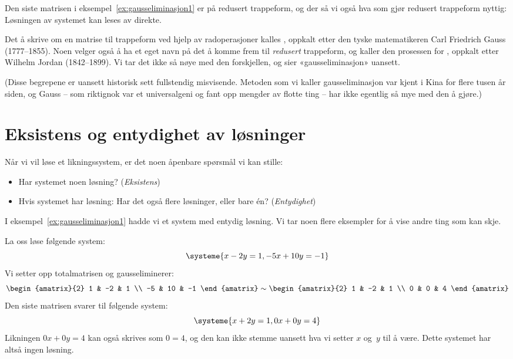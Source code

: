 Den siste matrisen i eksempel~\ref{ex:gausseliminasjon1} er på
redusert trappeform, og der så vi også hva som gjør redusert
trappeform nyttig: Løsningen av systemet kan leses av direkte.

\medskip
Det å  skrive om en matrise til trappeform
ved hjelp av radoperasjoner
kalles , oppkalt etter den tyske
matematikeren Carl Friedrich Gauss (1777--1855).  Noen velger også å
ha et eget navn på det å komme frem til \emph{redusert} trappeform, og
kaller den prosessen for , oppkalt
etter Wilhelm Jordan (1842--1899).  Vi tar det ikke så nøye med den
forskjellen, og sier «gauss\-eliminasjon» uansett.

(Disse begrepene er uansett historisk sett fullstendig misvisende.
Metoden som vi kaller gauss\-eli\-minasjon var kjent i Kina for flere
tusen år siden, og Gauss -- som riktignok var et universalgeni og fant
opp mengder av flotte ting -- har ikke egentlig så mye med den å
gjøre.)


\section*{Eksistens og entydighet av løsninger}

Når vi vil løse et likningssystem, er det noen åpenbare spørsmål vi
kan stille:
\begin{itemize}
\item Har systemet noen løsning? (\emph{Eksistens})
\item Hvis systemet har løsning: Har det også flere løsninger, eller
bare én?  (\emph{Entydighet})
\end{itemize}

I eksempel~\ref{ex:gausseliminasjon1} hadde vi et system med entydig
løsning.  Vi tar noen flere eksempler for å vise andre ting som kan
skje.

\begin{ex}
\label{ex:gausseliminasjon2}
La oss løse følgende system:
\[
\systeme{
   x -  2 y = 1,
-5 x + 10 y = -1
}
\]
Vi setter opp totalmatrisen og gausseliminerer:
\[
\begin{amatrix}{2}
 1 & -2 &  1 \\
-5 & 10 & -1
\end{amatrix}
\roweq
\begin{amatrix}{2}
1 & -2 & 1 \\
0 &  0 & 4
\end{amatrix}
\]
Den siste matrisen svarer til følgende system:
\[
\systeme{
  x + 2 y = 1,
0 x + 0 y = 4
}
\]
Likningen $0x + 0y = 4$ kan også skrives som $0 = 4$, og den kan ikke
stemme uansett hva vi setter $x$ og~$y$ til å være.  Dette systemet
har altså ingen løsning.
\end{ex}

